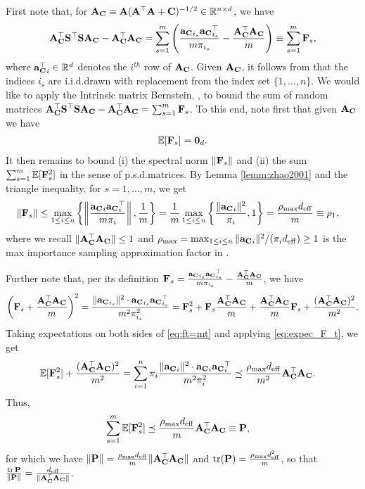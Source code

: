 \documentclass[11pt,a4paper]{article}
\begin{document}
First note that, for $\mathbf{A}_{\mathbf{C}} \equiv \mathbf{A}(\mathbf{A}^\top \mathbf{A}+\mathbf{C})^{-1/2} \in {\mathbb{R}}^{n \times d}$, we have
\begin{align*}
  \mathbf{A}_{\mathbf{C}}^\top\mathbf{S}^\top\mathbf{S}\mathbf{A}_{\mathbf{C}}-\mathbf{A}_{\mathbf{C}}^\top\mathbf{A}_{\mathbf{C}} = \sum_{s=1}^{m} \left( \frac{{\mathbf{a}_{\mathbf{C}}}_{i_s} {\mathbf{a}_{\mathbf{C}}}^\top_{i_s} }{m\pi_{i_s}}  -\frac{\mathbf{A}_{\mathbf{C}}^\top\mathbf{A}_{\mathbf{C}}}{m} \right) \equiv \sum_{s=1}^{m}\mathbf{F}_s,
\end{align*}
where ${\mathbf{a}^\top_{\mathbf{C}}}_i \in {\mathbb{R}}^{d}$ denotes the $i^{th}$ row of $\mathbf{A}_{\mathbf{C}}$.
Given $\mathbf{A}_{\mathbf{C}}$, it follows from  that the indices $i_s$ are i.i.d.\@ drawn with replacement from the index set $\{ 1, \ldots, n \}$.
We would like to apply the Intrinsic matrix Bernstein, , to bound the sum of random matrices $\mathbf{A}_{\mathbf{C}}^\top\mathbf{S}^\top\mathbf{S}\mathbf{A}_{\mathbf{C}}-\mathbf{A}_{\mathbf{C}}^\top\mathbf{A}_{\mathbf{C}} = \sum_{s=1}^{m}\mathbf{F}_s$.
To this end, note first that given $\mathbf{A}_{\mathbf{C}}$ we have
\begin{align} \label{eq:expec_F_t}
  {\mathbb{E}}[ \mathbf{F}_s ] = \mathbf{0}_d.
\end{align}
It then remains to bound (i) the spectral norm $\| \mathbf{F}_s \|$ and (ii) the sum $\sum^m_{s=1}{\mathbb{E}}[\mathbf{F}^2_s]$ in the sense of p.s.d.\@ matrices.
By Lemma \ref{lemm:zhao2001} and the triangle inequality, for $s=1,\ldots, m$, we get
\begin{align}
    \|\mathbf{F}_s\|&\leq\mathop{\rm{max}}\limits_{1\leq i \leq n} \left\{ \left\|\frac{ {\mathbf{a}_{\mathbf{C}}}_{i} {\mathbf{a}_{\mathbf{C}}}_{i}^\top }{m \pi_{i}} \right\|, \frac{1}{m} \right\} =\frac{1}{m}\mathop{\rm{max}}\limits_{1\leq i \leq n} \left\{ \frac{\|{\mathbf{a}_{\mathbf{C}}}_{i}\|^2}{\pi_{i}}, 1 \right\}  =\frac{\rho_{\max}  d_{\mathrm{eff}}}{m}  \equiv\rho_1,\nonumber
\end{align}
where we recall $\| \mathbf{A}_{\mathbf{C}}^\top \mathbf{A}_{\mathbf{C}} \| \leq 1$ and $\rho_{\max} = \max_{1 \leq i \leq n} \|{\mathbf{a}_{\mathbf{C}}}_{i}\|^2/(\pi_i d_{\mathrm{eff}}) \geq 1$ is the max importance sampling approximation factor in .


Further note that, per its definition $\mathbf{F}_s = \frac{{\mathbf{a}_{\mathbf{C}}}_{i_s} {\mathbf{a}_{\mathbf{C}}}^\top_{i_s} }{m\pi_{i_s}}  -\frac{\mathbf{A}_{\mathbf{C}}^\top\mathbf{A}_{\mathbf{C}}}{m}$, we have 
\begin{align}\label{eq:ft=mt}
  \left(\mathbf{F}_s+\frac{\mathbf{A}_{\mathbf{C}}^\top\mathbf{A}_{\mathbf{C}}}{m} \right)^2= \frac{ \| {\mathbf{a}_{\mathbf{C}}}_{i_s} \|^2 \cdot {\mathbf{a}_{\mathbf{C}}}_{i_s} {\mathbf{a}_{\mathbf{C}}}^\top_{i_s} }{m^2\pi_{i_s}^2} = \mathbf{F}^2_s + \mathbf{F}_s\frac{\mathbf{A}_{\mathbf{C}}^\top\mathbf{A}_{\mathbf{C}}}{m}+\frac{\mathbf{A}_{\mathbf{C}}^\top\mathbf{A}_{\mathbf{C}}}{m}\mathbf{F}_s+\frac{(\mathbf{A}_{\mathbf{C}}^\top\mathbf{A}_{\mathbf{C}})^2}{m^2}.
\end{align}
Taking expectations on both sides of \eqref{eq:ft=mt} and applying \eqref{eq:expec_F_t}, we get
\begin{align*}
    {\mathbb{E}}[\mathbf{F}^2_s] + \frac{(\mathbf{A}_{\mathbf{C}}^\top\mathbf{A}_{\mathbf{C}})^2}{m^2}&= \sum_{i=1}^{n}\pi_i\frac{ \|{\mathbf{a}_{\mathbf{C}}}_{i}\|^2 \cdot {\mathbf{a}_{\mathbf{C}}}_{i}{\mathbf{a}_{\mathbf{C}}}_{i}^\top}{m^2\pi^2_i}\preceq \frac{\rho_{\max} d_{\mathrm{eff}}}{m^2}\mathbf{A}_{\mathbf{C}}^\top\mathbf{A}_{\mathbf{C}}.
\end{align*}
Thus, 
\begin{align} 
        \sum_{s=1}^{m}{\mathbb{E}}[\mathbf{F}^2_s]& \preceq  \frac{\rho_{\max} d_{\mathrm{eff}}}{m}\mathbf{A}_{\mathbf{C}}^\top\mathbf{A}_{\mathbf{C}}
         \equiv \mathbf{P},\nonumber
\end{align}
for which we have $\|\mathbf{P}\|=\frac{\rho_{\max} d_{\mathrm{eff}}}{m}\|\mathbf{A}_{\mathbf{C}}^\top\mathbf{A}_{\mathbf{C}}\|$ and $\operatorname{tr}(\mathbf{P})=\frac{\rho_{\max} d^2_{\mathrm{eff}}}{m}$, so that $\frac{ \operatorname{tr} \mathbf{P} }{ \| \mathbf{P} \|} =  \frac{d_{\mathrm{eff}}}{\|\mathbf{A}_{\mathbf{C}}^\top\mathbf{A}_{\mathbf{C}}\| } $.
\end{document}
